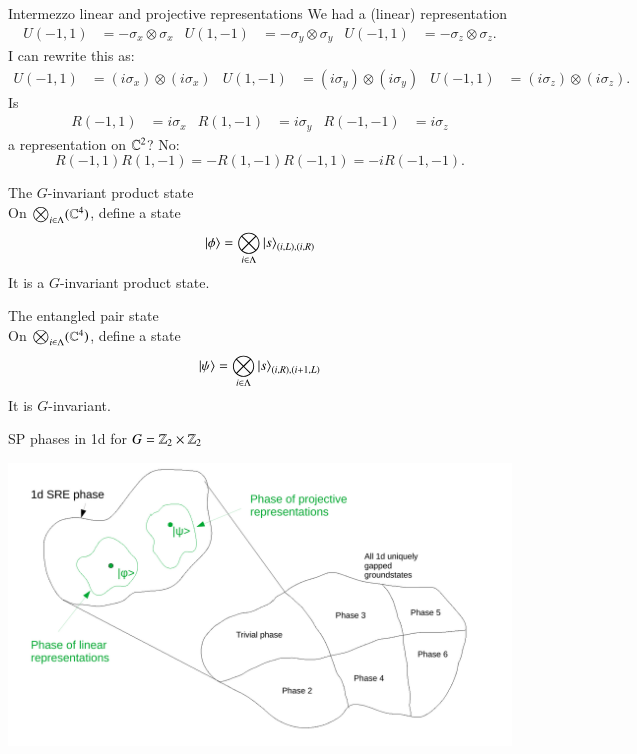 \documentclass{beamer}
\begin{document}
\begin{frame}{Intermezzo linear and projective representations}
	We had a (linear) representation
	\begin{align*}
			U(-1,1)&=-\sigma_x\otimes \sigma_x&U(1,-1)&=-\sigma_y\otimes \sigma_y&U(-1,1)&=-\sigma_z\otimes \sigma_z.
	\end{align*}
	\pause
	I can rewrite this as:\\
	\begin{align*}
	U(-1,1)&=(i\sigma_x)\otimes (i\sigma_x)&U(1,-1)&=(i\sigma_y)\otimes (i\sigma_y)&U(-1,1)&=(i\sigma_z)\otimes (i\sigma_z).
	\end{align*}
	\pause
	Is
	\begin{align*}
		R(-1,1)&=i\sigma_x&R(1,-1)&=i\sigma_y&R(-1,-1)&=i\sigma_z
	\end{align*}
	 a representation on $\mathbb{C}^2$? \pause No:
	\begin{equation*}
		R(-1,1)R(1,-1)=-R(1,-1)R(-1,1)=-i R(-1,-1).
	\end{equation*}
\end{frame}

\begin{frame}{The $G$-invariant product state}
	\\
	On $\bigotimes_{i\in\Lambda}(\mathbb{C}^4)$, define a state
	\begin{equation*}
		\ket{\phi}=\bigotimes_{i\in\Lambda}\ket{s}_{(i,L),(i,R)}
	\end{equation*}
	\pause
	It is a $G$-invariant product state.
\end{frame}

\begin{frame}{The entangled pair state}
	\\
	On $\bigotimes_{i\in\Lambda}(\mathbb{C}^4)$, define a state
	\begin{equation*}
		\ket{\psi}=\bigotimes_{i\in\Lambda}\ket{s}_{(i,R),(i+1,L)}
	\end{equation*}
	\pause
	It is $G$-invariant.
\end{frame}

\begin{frame}{SP phases in 1d for $G=\mathbb{Z}_2\times \mathbb{Z}_2$}
	\begin{center}
		\includegraphics[width=\linewidth]{Figures/SPT_Phases_1d.pdf}
	\end{center}
\end{frame}
\end{document}
